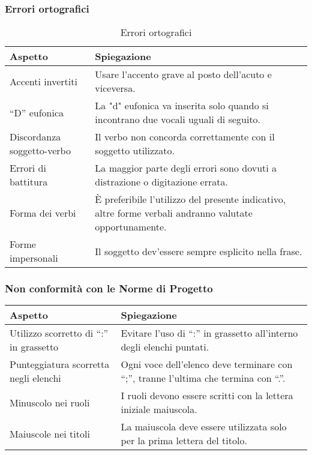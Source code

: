 \subsubsection{Errori ortografici}
\begin{table}[h!]
    \centering
    \renewcommand{\arraystretch}{1.5} %
    \begin{tabularx}{\textwidth}{|p{}|X|}
    \hline
    \rowcolor[HTML]{FFD700}
    \textbf{Aspetto} & \textbf{Spiegazione} \\ \hline
    Accenti invertiti & Usare l'accento grave al posto dell'acuto e viceversa. \\ \hline
    “D” eufonica & La "d" eufonica va inserita solo quando si incontrano due vocali uguali di seguito. \\ \hline
    Discordanza soggetto-verbo & Il verbo non concorda correttamente con il soggetto utilizzato. \\ \hline
    Errori di battitura & La maggior parte degli errori sono dovuti a distrazione o digitazione errata. \\ \hline
    Forma dei verbi  & È preferibile l’utilizzo del presente indicativo, altre forme verbali andranno valutate opportunamente. \\ \hline
    Forme impersonali & Il soggetto dev’essere sempre esplicito nella frase. \\ \hline

    \end{tabularx}
    \caption{Errori ortografici}
\end{table}


\subsubsection{Non conformità con le Norme di Progetto}
\begin{table}[h!]
    \centering
    \renewcommand{\arraystretch}{1.5} %
    \begin{tabularx}{\textwidth}{|p{}|X|}
    \hline
    \rowcolor[HTML]{FFD700}
    \textbf{Aspetto} & \textbf{Spiegazione} \\ \hline
    Utilizzo scorretto di “:” in grassetto & Evitare l'uso di “:” in grassetto all'interno degli elenchi puntati. \\ \hline
    Punteggiatura scorretta negli elenchi & Ogni voce dell'elenco deve terminare con “;”, tranne l'ultima che termina con “.”. \\ \hline
    Minuscolo nei ruoli & I ruoli devono essere scritti con la lettera iniziale maiuscola. \\ \hline
    Maiuscole nei titoli & La maiuscola deve essere utilizzata solo per la prima lettera del titolo. \\ \hline
\end{tabularx}
\end{table}
    
